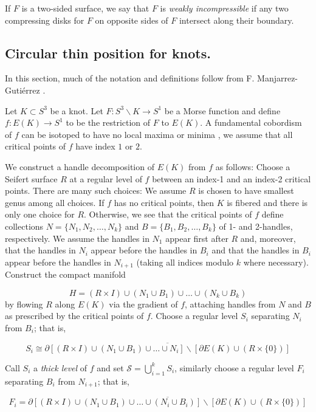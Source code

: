 \documentclass[12pt]{amsart}
\begin{document}
If $F$ is a two-sided surface, we say that $F$ is \emph{weakly incompressible} if any two compressing disks for $F$ on opposite sides of $F$ intersect along their boundary.

\subsection{Circular thin position for knots.}\label{thinthick}

In this section, much of the notation and definitions follow from F. Manjarrez-Gutiérrez \cite{Fabiola}.

Let $K\subset S^3$ be a knot. Let $F\colon S^3\backslash K\to S^1$ be a Morse function and define $f\colon E(K)\to S^1$ to be the restriction of $F$ to $E(K)$. A fundamental cobordism of $f$ can be isotoped to have no local maxima or minima \cite{Milnor}, we assume that all critical points of $f$ have index $1$ or $2$.

We construct a handle decomposition of $E(K)$ from $f$ as follows: Choose a Seifert surface $R$ at a regular level of $f$ between an index-1 and an index-2 critical points. There are many such 
choices: We assume $R$ is chosen to have smallest genus among all choices. If $f$ has no critical points, then $K$ is fibered and there is only one choice for $R$. Otherwise, we see that the 
critical points of $f$ define collections $N=\{N_{1},N_{2},\ldots,N_{k}\}$ and $B=\{B_{1},B_{2},\ldots,B_{k}\}$ of 1- and 2-handles, respectively. We assume the handles in $N_{1}$ appear first 
after $R$ and, moreover, that the handles in $N_{i}$ appear before the handles in $B_{i}$ and that the handles in $B_{i}$ appear before the handles in $N_{i+1}$ (taking all indices modulo $k$ where necessary). Construct the compact manifold

$$
H=(R\times I)\cup (N_{1}\cup B_{1})\cup\ldots\cup (N_{k}\cup B_{k})
$$
\noindent by flowing $R$ along $E(K)$ via the gradient of $f$, attaching handles from $N$ and $B$ as prescribed by the critical points of $f$. Choose a regular level $S_{i}$ separating $N_{i}$ from $B_{i}$; that is,

$$
S_{i}\cong\overline{\partial[(R\times I)\cup(N_{1}\cup B_{1})\cup\ldots\cup N_{i}]\backslash[\partial E(K)\cup (R\times \{0\})]}
$$ 

Call $S_{i}$ a \emph{thick level} of $f$ and set $\mathcal{S}=\bigcup_{i=1}^{k} S_{i}$, similarly choose a regular level $F_{i}$ separating $B_{i}$ from $N_{i+1}$; that is,

$$
F_{i}=\overline{\partial[(R\times I)\cup (N_{1}\cup B_{1})\cup\ldots\cup (N_{i}\cup B_{i})]\backslash [\partial E(K)\cup (R\times \{0\})]}
$$
\end{document}
